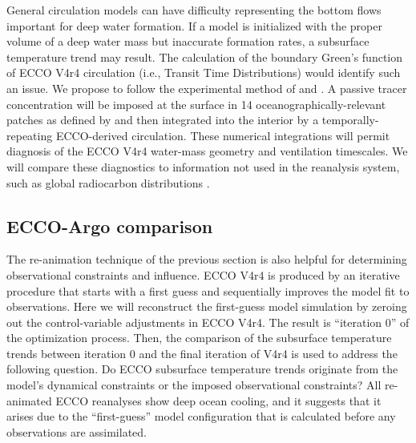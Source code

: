 \documentclass[authoryear,round,12pt]{article}
\begin{document}

General circulation models can have difficulty representing the bottom flows important for deep water formation. If a model is initialized with the proper volume of a deep water mass but inaccurate formation rates, a subsurface temperature trend may result. The calculation of the boundary Green's function of ECCO V4r4 circulation (i.e., Transit Time Distributions) would identify such an issue. We propose to follow the experimental method of \citet{Wunsch-Heimbach-2008:How} and \citet{Siberlin-Wunsch-2011:Oceanic}. A passive tracer concentration will be imposed at the surface in 14 oceanographically-relevant patches as defined by \citet{Gebbie-Huybers-2010:Total} and then integrated into the interior by a temporally-repeating ECCO-derived circulation. These numerical integrations will permit diagnosis of the ECCO V4r4 water-mass geometry and ventilation timescales. We will compare these diagnostics to information not used in the reanalysis system, such as global radiocarbon distributions \citep{Key-Kozyr-2004:global}.

\subsection{ECCO-Argo comparison}

The re-animation technique of the previous section is also helpful for
determining observational constraints and influence. ECCO V4r4 is
produced by an iterative procedure that starts with a first guess and
sequentially improves the model fit to observations. Here we will
reconstruct the first-guess model simulation by zeroing out the
control-variable adjustments in ECCO V4r4.  The result is ``iteration
0'' of the optimization process.
Then, the comparison of the subsurface temperature trends between iteration 0 and the final iteration of V4r4 is used to address the following question.
Do ECCO subsurface temperature trends originate from the model's
dynamical constraints or the imposed observational constraints?  All
re-animated ECCO reanalyses show deep ocean cooling, and it suggests
that it arises due to the ``first-guess'' model configuration that is
calculated before any observations are assimilated. 
\end{document}
